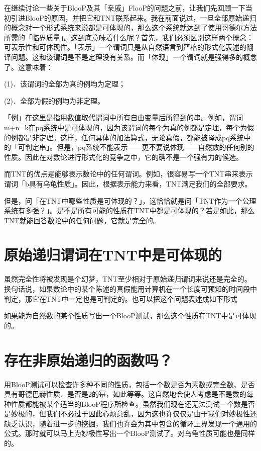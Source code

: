 \documentclass[
  12pt,
  twoside,
  openright,
  oldfontcommands,
]{memoir}
\begin{document}
在继续讨论一些关于BlooP及其「亲戚」FlooP的问题之前，让我们先回顾一下当初引进BlooP的原因，并把它和TNT联系起来。我在前面说过，一旦全部原始递归的概念对一个形式系统来说都是可体现的，那么这个系统就达到了使用哥德尔方法所需的「临界质量」。这到底意味着什么呢？首先，我们必须区别这样两个概念：可表示性和可体现性。「表示」一个谓词只是从自然语言到严格的形式化表述的翻译问题。这和该谓词是不是定理没有关系。而「体现」一个谓词就是强得多的概念了。这意味着：

(1)．该谓词的全部为真的例均为定理；

(2)．全部为假的例均为非定理。

「例」在这里是指用数值取代谓词中所有自由变量后所得到的串。例如，谓词m+n=k在pq系统中是可体现的，因为该谓词的每个为真的例都是定理，每个为假的例都是非定理。这样，任何具体的加法算式，无论真假，都能被译成pq系统中的「可判定串」。但是，pq系统不能表示------更不要说体现------自然数的任何别的性质。因此在对数论进行形式化的竞争之中，它的确不是一个强有力的候选。

而TNT的优点是能够表示数论中的任何谓词。例如，很容易写一个TNT串来表示谓词「b具有乌龟性质」。因此，根据表示能力来看，TNT满足我们的全部要求。

但是，问「在TNT中哪些性质是可体现的？」，这恰恰就是问「TNT作为一个公理系统有多强？」。是不是所有可能的性质在TNT中都是可体现的？若是如此，那么TNT就能回答数论中的任何问题，它就是完全的。

\section{原始递归谓词在TNT中是可体现的}

虽然完全性将被发现是个幻梦，TNT至少相对于原始递归谓词来说还是完全的。换句话说，如果数论中的某个陈述的真假能用计算机在一个长度可预知的时间段中判定，那它在TNT中一定也是可判定的。也可以把这个问题表述成如下形式

如果能为自然数的某个性质写出一个BlooP测试，那么这个性质在TNT中是可体现的。

\section{存在非原始递归的函数吗？}

用BlooP测试可以检查许多种不同的性质，包括一个数是否为素数或完全数、是否具有哥德巴赫性质、是否是2的幂，如此等等。这自然地会使人考虑是不是数的每种性质都能被某个适当的BlooP程序所检查。虽然我们现在还无法测试一个数是否是妙极的，但我们不必过于因此心烦意乱，因为这也许仅仅是由于我们对妙极性还缺乏认识，随着进一步的挖掘，我们也许会为其中包含的循环上界发现一个通用的公式。那时就可以马上为妙极性写出一个BlooP测试了。对乌龟性质可能也是同样的。
\end{document}

